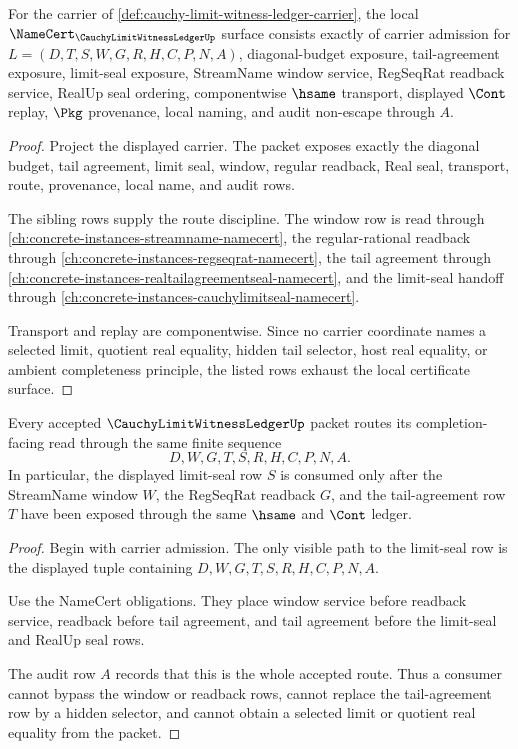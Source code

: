 \begin{theorem}
\label{thm:cauchy-limit-witness-ledger-namecert-obligations}
For the carrier of \autoref{def:cauchy-limit-witness-ledger-carrier}, the local $\NameCert_{\CauchyLimitWitnessLedgerUp}$ surface consists exactly of carrier admission for $L=(D,T,S,W,G,R,H,C,P,N,A)$, diagonal-budget exposure, tail-agreement exposure, limit-seal exposure, StreamName window service, RegSeqRat readback service, RealUp seal ordering, componentwise $\hsame$ transport, displayed $\Cont$ replay, $\Pkg$ provenance, local naming, and audit non-escape through $A$.
\end{theorem}
\begin{proof}
Project the displayed carrier. The packet exposes exactly the diagonal budget, tail agreement, limit seal, window, regular readback, Real seal, transport, route, provenance, local name, and audit rows.

The sibling rows supply the route discipline. The window row is read through \autoref{ch:concrete-instances-streamname-namecert}, the regular-rational readback through \autoref{ch:concrete-instances-regseqrat-namecert}, the tail agreement through \autoref{ch:concrete-instances-realtailagreementseal-namecert}, and the limit-seal handoff through \autoref{ch:concrete-instances-cauchylimitseal-namecert}.

Transport and replay are componentwise. Since no carrier coordinate names a selected limit, quotient real equality, hidden tail selector, host real equality, or ambient completeness principle, the listed rows exhaust the local certificate surface.
\end{proof}

\begin{theorem}
\label{thm:cauchy-limit-witness-ledger-tail-synchronization}
Every accepted $\CauchyLimitWitnessLedgerUp$ packet routes its completion-facing read through the same finite sequence
$$
D,W,G,T,S,R,H,C,P,N,A.
$$
In particular, the displayed limit-seal row $S$ is consumed only after the StreamName window $W$, the RegSeqRat readback $G$, and the tail-agreement row $T$ have been exposed through the same $\hsame$ and $\Cont$ ledger.
\end{theorem}
\begin{proof}
Begin with carrier admission. The only visible path to the limit-seal row is the displayed tuple containing $D,W,G,T,S,R,H,C,P,N,A$.

Use the NameCert obligations. They place window service before readback service, readback before tail agreement, and tail agreement before the limit-seal and RealUp seal rows.

The audit row $A$ records that this is the whole accepted route. Thus a consumer cannot bypass the window or readback rows, cannot replace the tail-agreement row by a hidden selector, and cannot obtain a selected limit or quotient real equality from the packet.
\end{proof}

